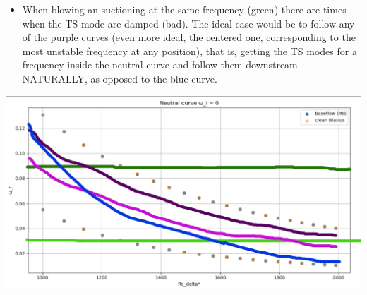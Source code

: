 \documentclass[
  aspectratio=169, %
  t, %
  onlytextwidth, %
  10pt, %
]{beamer}
\begin{document}
\begin{frame}
	\begin{itemize}
		\item When blowing an suctioning at the same frequency
		      (green) there are times when the TS mode are damped
		      (bad). The ideal case would be to follow any of the purple curves (even more ideal, the centered one, corresponding to the most unstable frequency at any position), that is, getting the TS modes for a frequency inside the neutral curve and follow them downstream NATURALLY, as opposed to the blue curve.
	\end{itemize}
	\centering
	\includegraphics[width=0.75\linewidth]{Images/neutralcurve_wlines.png}

\end{frame}
\end{document}
